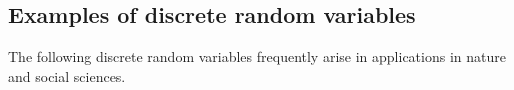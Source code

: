 \documentclass[12pt]{book}
\numberwithin{equation}{chapter}
\theoremstyle{plain}
\numberwithin{theorem}{section}
\newtheorem{proposition}[theorem]{\underline{Proposition}}
\theoremstyle{definition}
\newtheorem{definition}[theorem]{\underline{Definition}}
\newtheorem{remark}[theorem]{\underline{Remark}}
\numberwithin{exercise}{chapter}
\newcommand{\<}{\langle}
\renewcommand{\>}{\rangle}
\renewcommand{\(}{\left(}
\renewcommand{\)}{\right)}
\renewcommand{\[}{\left[}
\renewcommand{\]}{\right]}
\newcommand\Pb{\mathds{P}}
\newcommand\Rb{\mathds{R}}
\newcommand\dd{\mathrm{d}}
\begin{document}
%
%
%
%

\subsection*{Examples of discrete random variables}
The following discrete random variables frequently arise in applications in nature and social sciences.
\end{document}
